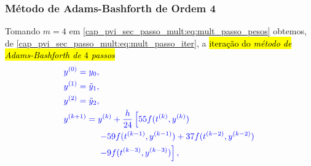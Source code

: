 \subsubsection{Método de Adams-Bashforth de Ordem 4}

Tomando $m=4$ em \eqref{cap_pvi_sec_passo_mult:eq:mult_passo_pesos} obtemos, de \eqref{cap_pvi_sec_passo_mult:eq:mult_passo_iter}, a \hl{iteração do \emph{método de Adams-Bashforth de $4$ passos}}
\begin{equation}\color{blue}\begin{aligned}
    &y^{(0)} = y_0,\\
    &y^{(1)} = \tilde{y}_1,\\
    &y^{(2)} = \tilde{y}_2,\\
    &y^{(k+1)} = y^{(k)} + \frac{h}{24}\left[55f(t^{(k)},y^{(k)}) \right.\\
    &\qquad\qquad\left. - 59f(t^{(k-1)},y^{(k-1)}) + 37f(t^{(k-2)},y^{(k-2)}) \right. \\
    &\qquad\qquad\left. -9f(t^{(k-3)},y^{(k-3)})\right],
  \end{aligned}
\end{equation}

